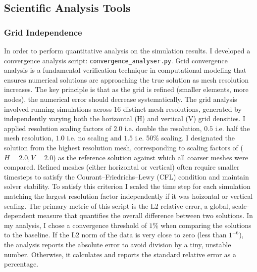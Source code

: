 \subsection{Scientific Analysis Tools} 
\subsubsection{Grid Independence}\label{grid_ind}
In order to  perform quantitative analysis on the simulation results. I developed a convergence analysis script: \texttt{convergence\_analyser.py}.
Grid convergence analysis is a fundamental verification technique in computational modeling that ensures numerical solutions are approaching the true solution as mesh resolution increases. The key principle is that as the grid is refined (smaller elements, more nodes), the numerical error should decrease systematically.
The grid analysis involved running simulations across 16 distinct mesh resolutions, generated by independently varying both the horizontal (H) and vertical (V) grid densities. 
I applied resolution scaling factors of $2.0$ i.e. double the resolution, $0.5$ i.e. half the mesh resolution, $1.0$ i.e. no scaling and $1.5$ i.e. 50\% scaling. I designated the solution from the highest resolution mesh, corresponding to scaling factors of ($H=2.0, V=2.0$) as the reference solution against which all coarser meshes were compared. Refined meshes (either horizontal or vertical) often require smaller timesteps to satisfy the Courant–Friedrichs–Lewy (CFL) condition and maintain solver stability. To satisfy this criterion I scaled the time step for each simulation matching the largest resolution factor independently if it was hoizontal or vertical scaling.
The primary metric of this script is the L2 relative error, a global, scale-dependent measure that quantifies the overall difference between two solutions. In my analysis, I chose a convergence threshold of $1\%$ when comparing the solutions to the baseline. If the L2 norm of the data is very close to zero (less than $1^{-6}$), the analysis reports the absolute error to avoid division by a tiny, unstable number. Otherwise, it calculates and reports the standard relative error as a percentage.%
